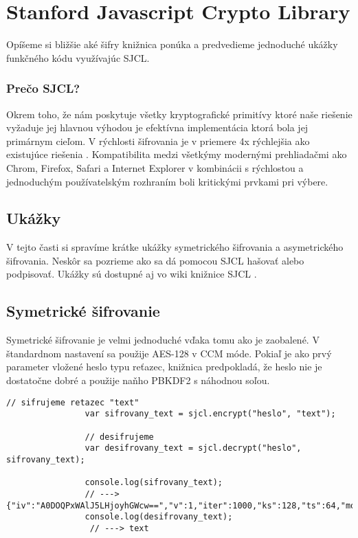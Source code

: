 \section{Stanford Javascript Crypto Library}
	
	Opíšeme si bližšie aké šifry knižnica ponúka a predvedieme jednoduché ukážky funkčného kódu využívajúc SJCL.
	
	\subsubsection{Prečo SJCL?}
	
		Okrem toho, že nám poskytuje všetky kryptografické primitívy ktoré naše riešenie vyžaduje jej hlavnou výhodou je efektívna implementácia ktorá bola jej primárnym cieľom. V rýchlosti šifrovania je v priemere 4x rýchlejšia ako existujúce riešenia \cite{SJCLtext}. Kompatibilita medzi všetkýmy modernými prehliadačmi ako Chrom, Firefox, Safari a Internet Explorer v kombinácii s rýchlostou a jednoduchým používatelským rozhraním boli kritickými prvkami pri výbere. 
		
	\subsection{Ukážky}
	
		V tejto časti si spravíme krátke ukážky symetrického šifrovania a asymetrického šifrovania. Neskôr sa pozrieme ako sa dá pomocou SJCL hašovať alebo podpisovať. Ukážky sú dostupné aj vo wiki knižnice SJCL \cite{SJCLwiki}.
		
		\subsection{Symetrické šifrovanie}
			
			Symetrické šifrovanie je velmi jednoduché vďaka tomu ako je zaobalené. V štandardnom nastavení sa použije AES-128 v CCM móde. Pokiaľ je ako prvý parameter vložené heslo typu reťazec, knižnica predpokladá, že heslo nie je dostatočne dobré a použije naňho PBKDF2 s náhodnou soľou.
			
			\medskip
			\begin{lstlisting}[caption=Symetrické šifrovanie]
				// sifrujeme retazec "text" 
				var sifrovany_text = sjcl.encrypt("heslo", "text"); 
				
				// desifrujeme
				var desifrovany_text = sjcl.decrypt("heslo", sifrovany_text);  
				
				console.log(sifrovany_text);    
				// ---> {"iv":"A0DOQPxWAlJ5LHjoyhGWcw==","v":1,"iter":1000,"ks":128,"ts":64,"mode":"ccm","adata":"","cipher":"aes","salt":"Kk+ws1Xj0Xo=","ct":"text_v_zasifrovanom_tvate_bude_tu"}
				console.log(desifrovany_text);   
				 // ---> text
				
							
			\end{lstlisting}
			
